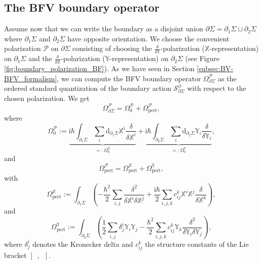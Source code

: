 \documentclass[11pt,colorinlistoftodos]{amsart}
\numberwithin{equation}{subsection}
\theoremstyle{plain}
\theoremstyle{definition}
\theoremstyle{remark}
\newcommand{\dd}{{\mathrm{d}}}
\newcommand{\de}{\partial}
\newcommand{\calS}{\mathcal{S}}
\newcommand{\calP}{\mathcal{P}}
\newcommand{\I}{\mathrm{i}}
\begin{document}
\subsection{The BFV boundary operator}
Assume now that we can write the boundary as a disjoint union $\de\Sigma=\de_1\Sigma\sqcup\de_2\Sigma$ where $\de_1\Sigma$ and $\de_2\Sigma$ have opposite orientation. We choose the convenient polarization $\calP$ on $\de\Sigma$ consisting of choosing the $\frac{\delta}{\delta \mathds{Y}}$-polarization ($\mathds{X}$-representation) on $\de_1\Sigma$ and the $\frac{\delta}{\delta\mathds{X}}$-polarization ($\mathds{Y}$-representation) on $\de_2\Sigma$ (see Figure \ref{fig:boundary_polarization_BF}).
As we have seen in Section \ref{subsec:BV-BFV_formalism}, we can compute the BFV boundary operator $\Omega^\calP_{\de\Sigma}$ as the ordered standard quantization of the boundary action $\calS^\de_{\de\Sigma}$ with respect to the chosen polarization. 
We get 
\[
\Omega^\calP_{\de\Sigma}=\Omega^\calP_0+\Omega^\calP_\mathrm{pert},
\]
where 
\begin{equation}
\label{eq:boundary_operator_0}
\Omega^\calP_0:=\underbrace{\I\hbar\int_{\de_1\Sigma}\sum_i\dd_{\de_1\Sigma}\mathds{X}^i\frac{\delta}{\delta\mathds{X}^i}}_{=:\Omega_0^\mathds{X}}+\underbrace{\I\hbar\int_{\de_2\Sigma}\sum_i\dd_{\de_2\Sigma}\mathds{Y}_i\frac{\delta}{\delta\mathds{Y}_i}}_{=:\Omega^\mathds{Y}_0},
\end{equation}
and 
\begin{equation}
\label{eq:boundary_operator_pert}
\Omega^\calP_\mathrm{pert}=\Omega^\mathds{X}_\mathrm{pert}+\Omega^\mathds{Y}_\mathrm{pert},
\end{equation}
with
\begin{equation}
\label{eq:boundary_operator_pert_X}
\Omega^\mathds{X}_\mathrm{pert}:=\int_{\de_1\Sigma}\left(-\frac{\hbar^2}{2}\sum_{i,j}\frac{\delta^2}{\delta\mathds{X}^i\delta\mathds{X}^j}+\frac{\I\hbar}{2}\sum_{i,j,k}c_{ij}^k\mathds{X}^i\mathds{X}^j\frac{\delta}{\delta\mathds{X}^k}\right),
\end{equation}
and 
\begin{equation}
\label{eq:boundary_operator_pert_Y}
\Omega^\mathds{Y}_\mathrm{pert}:=\int_{\de_2\Sigma}\left(\frac{1}{2}\sum_{i,j}\delta^{i}_j\mathds{Y}_i\mathds{Y}_j-\frac{\hbar^2}{2}\sum_{i,j,k}c_{ij}^k \mathds{Y}_k\frac{\delta^2}{\delta\mathds{Y}_i\delta\mathds{Y}_j}\right),
\end{equation}
where $\delta^{i}_j$ denotes the Kronecker delta and $c_{ij}^k$ the structure constants of the Lie bracket $[\enspace,\enspace]$. 
\end{document}
